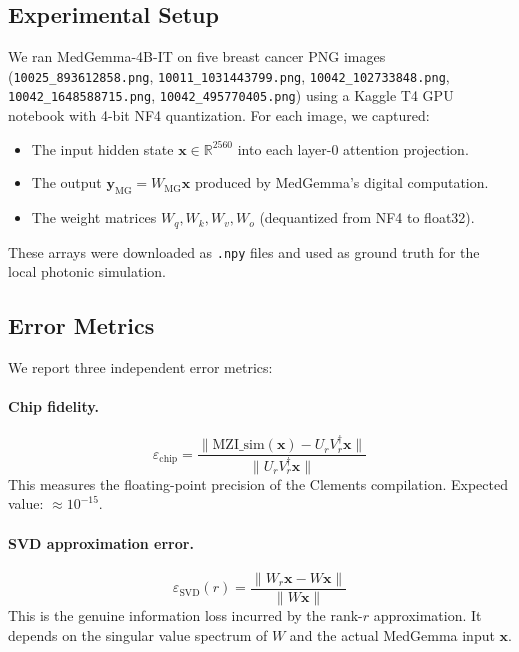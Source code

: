 \documentclass[12pt, a4paper]{article}
\begin{document}
\subsection{Experimental Setup}

We ran MedGemma-4B-IT on five breast cancer PNG images
(\texttt{10025\_893612858.png}, \texttt{10011\_1031443799.png},
\texttt{10042\_102733848.png}, \texttt{10042\_1648588715.png},
\texttt{10042\_495770405.png})
using a Kaggle T4 GPU notebook with 4-bit NF4 quantization.
For each image, we captured:
\begin{itemize}
  \item The input hidden state $\mathbf{x} \in \mathbb{R}^{2560}$ into each
        layer-0 attention projection.
  \item The output $\mathbf{y}_{\text{MG}} = W_{\text{MG}} \mathbf{x}$
        produced by MedGemma's digital computation.
  \item The weight matrices $W_q, W_k, W_v, W_o$ (dequantized from NF4 to
        float32).
\end{itemize}
These arrays were downloaded as \texttt{.npy} files and used as ground truth
for the local photonic simulation.

\subsection{Error Metrics}

We report three independent error metrics:

\paragraph{Chip fidelity.}
\begin{equation}
  \varepsilon_{\text{chip}} =
  \frac{\| \text{MZI\_sim}(\mathbf{x}) - U_r V_r^\dagger \mathbf{x} \|}
       {\| U_r V_r^\dagger \mathbf{x} \|}
  \label{eq:chip_fidelity}
\end{equation}
This measures the floating-point precision of the Clements compilation.
Expected value: $\approx 10^{-15}$.

\paragraph{SVD approximation error.}
\begin{equation}
  \varepsilon_{\text{SVD}}(r) =
  \frac{\| W_r \mathbf{x} - W \mathbf{x} \|}
       {\| W \mathbf{x} \|}
  \label{eq:svd_error}
\end{equation}
This is the genuine information loss incurred by the rank-$r$ approximation.
It depends on the singular value spectrum of $W$ and the actual MedGemma input
$\mathbf{x}$.
\end{document}

